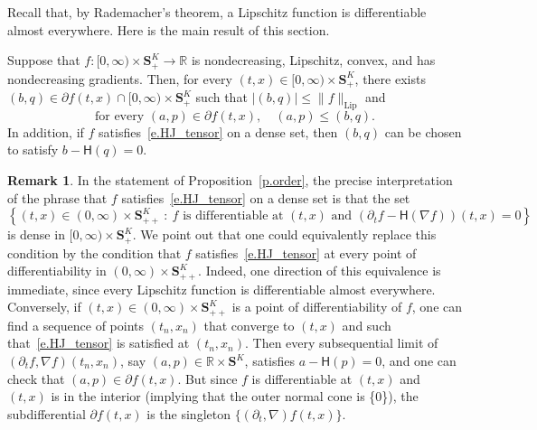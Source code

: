 \documentclass[10pt]{amsart}
\theoremstyle{definition}\newtheorem{defi}[theo]{Definition}\newtheorem{rema}[theo]{Remark}\newtheorem{exam}[theo]{Example}\newtheorem{exem}[theo]{Example}\newtheorem{nota}[theo]{Notation}
\newcommand{\R}{\mathbb{R}}
\renewcommand{\S}{\mathbf{S}}
\newcommand{\Lip}{\mathrm{Lip}}
\renewcommand{\H}{\mathsf{H}}
\renewcommand{\leq}{\leqslant}
\newcommand{\Ll}{\left}
\newcommand{\Rr}{\right}
\newcommand{\dr}{\partial}
\newcommand{\msf}{\mathsf}
\begin{document}
Recall that, by Rademacher's theorem, a Lipschitz function is differentiable almost everywhere. Here is the main result of this section.



\begin{prop}\label{p.order}
Suppose that $f:[0,\infty)\times \S^K_+\to \R$ is nondecreasing, Lipschitz, convex, and has nondecreasing gradients. Then, for every $(t,x)\in [0,\infty)\times \S^K_+ $, there exists $(b,q)\in\partial f(t,x)\cap [0,\infty)\times \S^K_+$ such that $|(b,q)|\leq \|f\|_{\Lip}$ and
\begin{equation}\label{e.l.order}
\text{for every } (a,p)\in \partial f(t,x), \quad (a,p)\leq (b,q).
\end{equation}
In addition, if $f$ satisfies~\eqref{e.HJ_tensor} on a dense set, then $(b,q)$ can be chosen to satisfy $b-\H(q)= 0$.
\end{prop}

\begin{rema}\label{r.ae.diff}
In the statement of Proposition~\ref{p.order}, the precise interpretation of the phrase that $f$ satisfies~\eqref{e.HJ_tensor} on a dense set is that the set
\begin{equation*}
\Ll\{ (t,x) \in (0,\infty)\times \S^K_{++} \ : \ \text{$f$ is differentiable at $(t,x)$ and } \left(\dr_t f - \msf H(\nabla f) \right) (t,x) = 0 \Rr\}
\end{equation*}
is dense in $[0,\infty) \times \S^K_+$. We point out that one could equivalently replace this condition by the condition that $f$ satisfies~\eqref{e.HJ_tensor} at every point of differentiability in $(0,\infty) \times \S^K_{++}$. Indeed, one direction of this equivalence is immediate, since every Lipschitz function is differentiable almost everywhere. Conversely, if $(t,x) \in (0,\infty) \times \S^K_{++}$ is a point of differentiability of $f$, one can find a sequence of points $(t_n,x_n)$ that converge to $(t,x)$ and such that~\eqref{e.HJ_tensor} is satisfied at $(t_n,x_n)$. Then every subsequential limit of $(\dr_t f, \nabla f)(t_n,x_n)$, say $(a,p) \in \R \times \S^K$, satisfies $a - \msf H(p) = 0$, and one can check that $(a,p) \in \dr f(t,x)$. But since $f$ is differentiable at $(t,x)$ and $(t,x)$ is in the interior (implying that the outer normal cone is \{0\}), the subdifferential $\dr f(t,x)$ is the singleton $\{(\dr_t, \nabla)f(t,x)\}$.
\end{rema}
\end{document}
